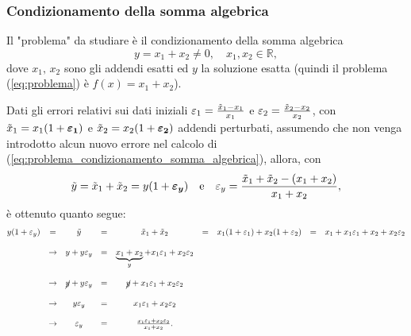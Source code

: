 \subsubsection{Condizionamento della somma algebrica}\label{sssec:condizionamento_somma_algebrica}
Il "problema" da studiare è il condizionamento della somma algebrica
\begin{equation}\label{eq:problema_condizionamento_somma_algebrica}
	y=x_1+x_2\neq 0,\quad x_1,x_2\in\mathbb R,
\end{equation}
dove $x_1,\, x_2$ sono gli addendi esatti ed $y$ la soluzione esatta (quindi il problema (\ref{eq:problema}) è $f(x) = x_1 + x_2$).

Dati gli errori relativi sui dati iniziali $\varepsilon_1=\frac{\Tilde{x}_1-x_1}{x_1}$ e $\varepsilon_2=\frac{\Tilde{x}_2-x_2}{x_2}$, con $\Tilde{x}_1=x_1(1+\boldsymbol{\varepsilon_1})$ e $\Tilde{x}_2=x_2(1+\boldsymbol{\varepsilon_2})$ addendi perturbati, assumendo che non venga introdotto alcun nuovo errore nel calcolo di (\ref{eq:problema_condizionamento_somma_algebrica}), allora, con
\begin{equation*}
	\Tilde{y}=\Tilde{x}_1+\Tilde{x}_2=y(1+\boldsymbol{\varepsilon_y})\quad\text{e}\quad\varepsilon_y=\frac{\Tilde{x}_1+\Tilde{x}_2-(x_1+x_2)}{x_1+x_2},
\end{equation*}
è ottenuto quanto segue:
\begin{equation}\label{eq:errore_relativo_y_somma_algebrica}
	\begin{matrix}
		y(1+\varepsilon_y)&=&\Tilde{y}&=&\Tilde{x}_1+\Tilde{x}_2&=&x_1(1+\varepsilon_1)+x_2(1+\varepsilon_2)&=&x_1+x_1\varepsilon_1+x_2+x_2\varepsilon_2\\\\
		&\rightarrow& y+y\varepsilon_y&=&\underbrace{x_1+x_2}_{y}+x_1\varepsilon_1+x_2\varepsilon_2\\\\
		&\rightarrow& \cancel{y}+y\varepsilon_y &=& \cancel{y}+x_1\varepsilon_1+x_2\varepsilon_2\\\\
		&\rightarrow& y\varepsilon_y &=& x_1\varepsilon_1+x_2\varepsilon_2 \\\\
		&\rightarrow& \varepsilon_y &=& \frac{x_1\varepsilon_1+x_2\varepsilon_2}{x_1+x_2}.
	\end{matrix}
\end{equation}

